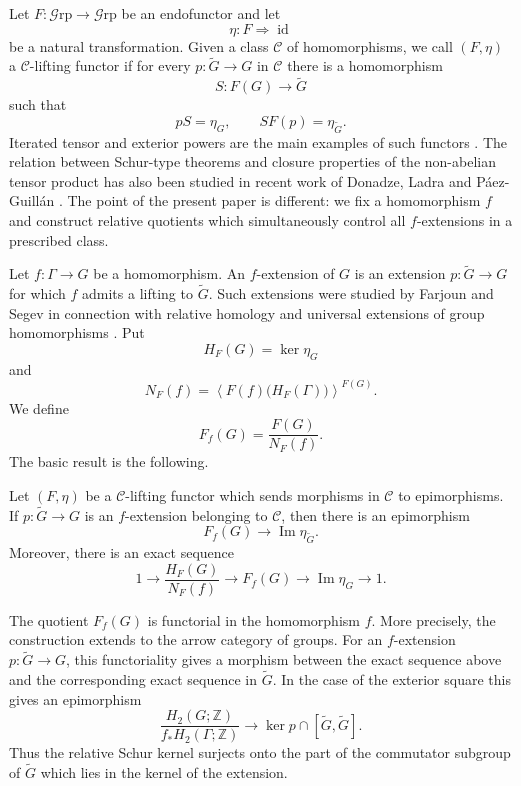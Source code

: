 \documentclass[10pt]{amsart}
\newtheorem*{theorem**}{Theorem\theoremnum}
\newenvironment{theorem*}[1][]{%
  \edef\theoremnum{\if\relax\detokenize{#1}\relax\else~#1\fi}%
  \begin{theorem**}
}{%
  \end{theorem**}
}
\renewcommand{\*}{\cdot {\dots} \cdot}
\newcommand{\?}[1]{\overset{?}{#1}}
\newcommand{\id}{\operatorname{id}}
\newcommand{\Grp}{\mathcal{G}\text{rp}}
\numberwithin{equation}{section}
\begin{document}
Let $F\colon\Grp\to\Grp$ be an endofunctor and let
\[
\eta\colon F\Longrightarrow\id
\]
be a natural transformation. Given a class $\mathcal C$ of
homomorphisms, we call $(F,\eta)$ a $\mathcal C$-lifting functor
if for every $p\colon\widetilde G\to G$ in $\mathcal C$ there is
a homomorphism
\[
S\colon F(G)\longrightarrow\widetilde G
\]
such that
\[
pS=\eta_G,
\qquad
SF(p)=\eta_{\widetilde G}.
\]
Iterated tensor and exterior powers are the main examples of such functors
\cite{BrownLoday1984,BrownLoday1987, DonadzeGarciaMartinez2021}.
The relation between Schur-type theorems and closure properties
of the non-abelian tensor product has also been studied in
recent work of Donadze, Ladra and P\'aez-Guill\'an
\cite{DonadzeLadraPaezGuillan2026}. The point of the present paper
is different: we fix a homomorphism $f$ and construct relative
quotients which simultaneously control all $f$-extensions in a
prescribed class.

Let $f\colon\Gamma\to G$ be a homomorphism. An $f$-extension of
$G$ is an extension $p\colon\widetilde G\to G$ for which $f$
admits a lifting to $\widetilde G$. Such extensions were studied
by Farjoun and Segev in connection with relative homology and
universal extensions of group homomorphisms
\cite{FarjounSegev2017}. Put
\[
H_F(G)=\ker\eta_G
\]
and
\[
N_F(f)=
\left\langle F(f)\bigl(H_F(\Gamma)\bigr)\right\rangle^{F(G)}.
\]
We define
\[
F_f(G)=\frac{F(G)}{N_F(f)}.
\]
The basic result is the following.

\begin{theorem*}
Let $(F,\eta)$ be a $\mathcal C$-lifting functor which sends
morphisms in $\mathcal C$ to epimorphisms. If
$p\colon\widetilde G\to G$ is an $f$-extension belonging to
$\mathcal C$, then there is an epimorphism
\[
F_f(G)\longrightarrow\operatorname{Im}\eta_{\widetilde G}.
\]
Moreover, there is an exact sequence
\[
1\longrightarrow
\frac{H_F(G)}{N_F(f)}
\longrightarrow F_f(G)
\longrightarrow\operatorname{Im}\eta_G
\longrightarrow1.
\]
\end{theorem*}

The quotient $F_f(G)$ is functorial in the homomorphism $f$.
More precisely, the construction extends to the arrow category of
groups. For an $f$-extension $p\colon\widetilde G\to G$, this
functoriality gives a morphism between the exact sequence above
and the corresponding exact sequence in $\widetilde G$. In the
case of the exterior square this gives an epimorphism
\[
\frac{H_2(G;\mathbb Z)}{f_*H_2(\Gamma;\mathbb Z)}
\longrightarrow
\ker p\cap[\widetilde G,\widetilde G].
\]
Thus the relative Schur kernel surjects onto the part of the commutator subgroup of $\widetilde G$
which lies in the kernel of the extension.
\end{document}
